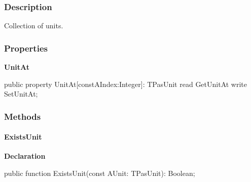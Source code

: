 \documentclass{report}
\newif\ifpdf
\begin{document}
\subsubsection*{\large{\textbf{Description}}\normalsize\hspace{1ex}\hfill}
Collection of units.\subsubsection*{\large{\textbf{Properties}}\normalsize\hspace{1ex}\hfill}
\begin{list}{}{
\setlength{\itemindent}{0cm}
\setlength{\listparindent}{0cm}
\setlength{\leftmargin}{\evensidemargin}
\addtolength{\leftmargin}{\tmplength}
\settowidth{\labelsep}{X}
\addtolength{\leftmargin}{\labelsep}
\setlength{\labelwidth}{\tmplength}
}
\label{PasDoc_Items.TPasUnits-UnitAt}
\item[\textbf{UnitAt}\hfill]
\ifpdf
\begin{flushleft}
\fi
\begin{ttfamily}
public property UnitAt[constAIndex:Integer]: TPasUnit
      read GetUnitAt
      write SetUnitAt;\end{ttfamily}

\ifpdf
\end{flushleft}
\fi


\par  \end{list}
\subsubsection*{\large{\textbf{Methods}}\normalsize\hspace{1ex}\hfill}
\paragraph*{ExistsUnit}\hspace*{\fill}

\label{PasDoc_Items.TPasUnits-ExistsUnit}
\begin{list}{}{
\setlength{\itemindent}{0cm}
\setlength{\listparindent}{0cm}
\setlength{\leftmargin}{\evensidemargin}
\addtolength{\leftmargin}{\tmplength}
\settowidth{\labelsep}{X}
\addtolength{\leftmargin}{\labelsep}
\setlength{\labelwidth}{\tmplength}
}
\item[\textbf{Declaration}\hfill]
\ifpdf
\begin{flushleft}
\fi
\begin{ttfamily}
public function ExistsUnit(const AUnit: TPasUnit): Boolean;\end{ttfamily}

\ifpdf
\end{flushleft}
\fi

\end{list}
\end{document}
